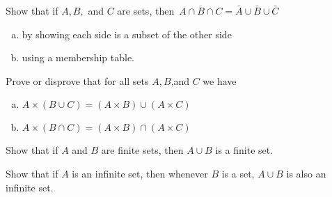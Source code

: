 \documentclass{article}
\newcommand{\olsi}[1]{\,\overline{\!{#1}}} %
\newenvironment{problem}[2][Problem]{\begin{trivlist}
\item[\hskip \labelsep {\bfseries #1}\hskip \labelsep {\bfseries #2.}]}{\end{trivlist}}
\begin{document}
\begin{problem}{12}[Chapter 2.2, Question 19]
Show that if $A,B,$ and $C$ are sets, then $ \olsi{A \cap B \cap C} = \bar{A} \cup \bar{B} \cup \bar{C}$
\begin{enumerate}[(a)]
    \item by showing each side is a subset of the other side
    \item using a membership table.
\end{enumerate}
\end{problem}
\begin{problem}{12}[Chapter 2.2, Question 36]
Prove or disprove that for all sets $A,B$,and $C$ we have
\begin{enumerate}[(a)]
    \item $A \times (B \cup C) = (A \times B) \cup (A \times C)$
    \item $A \times (B \cap C) = (A \times B) \cap (A \times C)$
\end{enumerate}
\end{problem}

\begin{problem}{13}[Chapter 2.2, Question 50]
 Show that if $A$ and $B$ are finite sets, then $ A \cup B$ is a finite set.
\end{problem}
\begin{problem}{14}[Chapter 2.2, Question 51]
    Show that if $A$ is an infinite set, then whenever $B$ is a set, $ A \cup B$ is also an  infinite set.
\end{problem}
\end{document}
